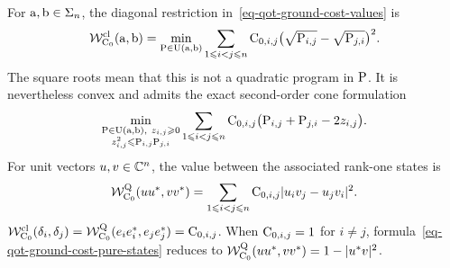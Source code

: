 \begin{prop}\label{prop-qot-classical-restriction}
For $\a,\b\in\simplex_n$, the diagonal restriction in~\eqref{eq-qot-ground-cost-values} is
\begin{equation}\label{eq-qot-classical-square-root-program}
\mathcal W_{\C_0}^{\mathrm{cl}}(\a,\b)
=
\min_{\P\in\CouplingsD(\a,\b)}
\sum_{1\leq i<j\leq n}
\C_{0,i,j}\bigl(\sqrt{\P_{i,j}}-\sqrt{\P_{j,i}}\bigr)^2.
\end{equation}
The square roots mean that this is not a quadratic program in $\P$. It is nevertheless convex and admits the exact second-order cone formulation
\begin{equation}\label{eq-qot-classical-socp}
\min_{\substack{\P\in\CouplingsD(\a,\b),\ z_{i,j}\geq0\\
z_{i,j}^2\leq\P_{i,j}\P_{j,i}}}
\sum_{1\leq i<j\leq n}\C_{0,i,j}
\bigl(\P_{i,j}+\P_{j,i}-2z_{i,j}\bigr).
\end{equation}
For unit vectors $u,v\in\CC^n$, the value between the associated rank-one states is
\begin{equation}\label{eq-qot-ground-cost-pure-states}
\mathcal W_{\C_0}^{\mathrm Q}(uu^*,vv^*)
=
\sum_{1\leq i<j\leq n}\C_{0,i,j}|u_i v_j-u_j v_i|^2.
\end{equation}
$\mathcal W_{\C_0}^{\mathrm{cl}}(\delta_i,\delta_j)
=\mathcal W_{\C_0}^{\mathrm Q}(e_i e_i^*,e_j e_j^*)=\C_{0,i,j}$.
When $\C_{0,i,j}=1$ for $i\neq j$, formula~\eqref{eq-qot-ground-cost-pure-states} reduces to
$\mathcal W_{\C_0}^{\mathrm Q}(uu^*,vv^*)=1-|u^*v|^2$.
\end{prop}
